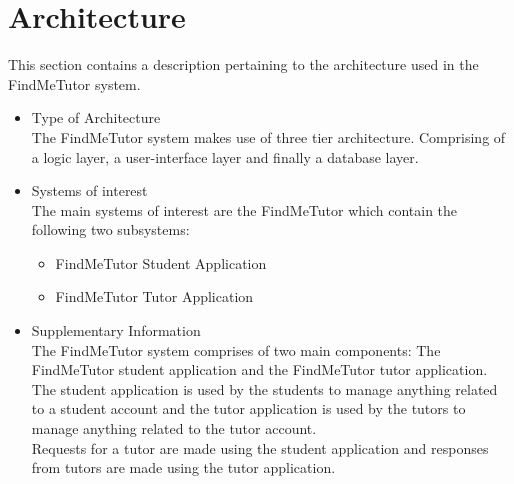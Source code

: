 \documentclass[12pt]{article}
\begin{document}

\section{Architecture}
This section contains a description pertaining to the architecture used in the FindMeTutor system.
\begin{itemize}
\item Type of Architecture\\
The FindMeTutor system makes use of three tier architecture. Comprising of a logic layer, a user-interface layer and finally a database layer.
\item Systems of interest\\
The main systems of interest are the FindMeTutor which contain the following two subsystems:\\
\begin{itemize}
\item FindMeTutor Student Application\\
\item FindMeTutor Tutor Application\\
\end{itemize}
\item Supplementary Information\\
The FindMeTutor system comprises of two main components: The FindMeTutor student application and the FindMeTutor tutor application. The student application is used by the students to manage anything related to a student account and the tutor application is used by the tutors to manage anything related to the tutor account. \\
Requests for a tutor are made using the student application and responses from tutors are made using the tutor application.
\end{itemize}
\end{document}
